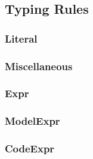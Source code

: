 

\subsection{Typing Rules}

\subsubsection{Literal}



\subsubsection{Miscellaneous}



\subsubsection{Expr}



\subsubsection{ModelExpr}



\subsubsection{CodeExpr}


